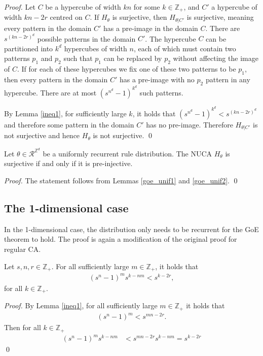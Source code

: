 \documentclass[runningheads]{llncs}
\newcommand{\Z}{\mathbb{Z}}
\begin{document}
\begin{proof}
Let $C$ be a hypercube of width $kn$ for some $k\in \Z_+$, and $C'$ a hypercube of width $kn-2r$ centred on $C$. If $H_\theta$ is surjective, then $H_{\theta|C'}$ is surjective, meaning every pattern in the domain $C'$ has a pre-image in the domain $C$. There are $s^{(kn-2r)^d}$ possible patterns in the domain $C'$. The hypercube $C$ can be partitioned into $k^d$ hypercubes of width $n$, each of which must contain two patterns $p_1$ and $p_2$ such that $p_1$ can be replaced by $p_2$ without affecting the image of $C$. If for each of these hypercubes we fix one of these two patterns to be $p_1$, then every pattern in the domain $C'$ has a pre-image with no $p_2$ pattern in any hypercube. There are at most $(s^{n^d}-1)^{k^d}$ such patterns. 

By Lemma \ref{ineq1}, for sufficiently large $k$, it holds that $(s^{n^d}-1)^{k^d}<s^{(kn-2r)^d}$ and therefore some pattern in the domain $C'$ has no pre-image. Therefore $H_{\theta|C'}$ is not surjective and hence $H_\theta$ is not surjective.
\qed
\end{proof}



\begin{theorem} \label{goe_unif}
Let $\theta \in \mathcal{R}^{\Z^d}$ be a uniformly recurrent rule distribution. The NUCA $H_\theta$ is surjective if and only if it is pre-injective.
\end{theorem}

\begin{proof} 
The statement follows from Lemmas \ref{goe_unif1} and \ref{goe_unif2}. 
\qed
\end{proof}

\subsection{The 1-dimensional case}

In the 1-dimensional case, the distribution only needs to be recurrent for the GoE theorem to hold. The proof is again a modification of the original proof for regular CA.

\begin{lemma} \label{ineq2}
Let $s,n,r \in \Z_+$. For all sufficiently large $m \in \Z_+$, it holds that
\begin{align*}
(s^n-1)^m s^{k-nm} < s^{k-2r},
\end{align*}
for all $k \in \Z_+$.
\end{lemma}

\begin{proof}
By Lemma \ref{ineq1}, for all sufficiently large $m \in \Z_+$ it holds that
\begin{align*}
(s^n -1)^m < s^{mn-2r}. 
\end{align*}
Then for all $k \in \Z_+$
\begin{align*}
(s^n -1)^m s^{k-nm} &< s^{mn-2r} s^{k-nm} = s^{k-2r}
\end{align*}
\qed
\end{proof}
\end{document}
